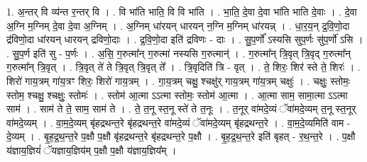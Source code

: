 \documentclass[17pt]{extarticle}
\begin{document}
1. अ॒न्तर् वि व्य॑न्त र॒न्तर् वि । . वि भा॑ति भाति॒ वि वि भा॑ति । . भा॒ति॒ दे॒वा दे॒वा भा॑ति भाति दे॒वाः । . दे॒वा अ॒ग्नि म॒ग्निम् दे॒वा दे॒वा अ॒ग्निम् । . अ॒ग्निम् धा॑रयन् धारयन् न॒ग्नि म॒ग्निम् धा॑रयन्न् । . धा॒र॒य॒न् द्र॒वि॒णो॒दा द्र॑विणो॒दा धा॑रयन् धारयन् द्रविणो॒दाः । . द्र॒वि॒णो॒दा इति॑ द्रविणः - दाः । . सु॒प॒र्णो᳚ ऽस्यसि सुप॒र्णः सु॑प॒र्णो॑ ऽसि । . सु॒प॒र्ण इति॑ सु - प॒र्णः । . अ॒सि॒ ग॒रुत्मा᳚न् ग॒रुत्मा॑ नस्यसि ग॒रुत्मान्॑ । . ग॒रुत्मा᳚न् त्रि॒वृत् त्रि॒वृद् ग॒रुत्मा᳚न् ग॒रुत्मा᳚न् त्रि॒वृत् । . त्रि॒वृत् ते॑ ते त्रि॒वृत् त्रि॒वृत् ते᳚ । . त्रि॒वृदिति॑ त्रि - वृत् । . ते॒ शिरः॒ शिर॑ स्ते ते॒ शिरः॑ । . शिरो॑ गाय॒त्रम् गा॑य॒त्रꣳ शिरः॒ शिरो॑ गाय॒त्रम् । . गा॒य॒त्रम् चक्षु॒ श्चक्षु॑र् गाय॒त्रम् गा॑य॒त्रम् चक्षुः॑ । . चक्षुः॒ स्तोमः॒ स्तोम॒ श्चक्षु॒ श्चक्षुः॒ स्तोमः॑ । . स्तोम॑ आ॒त्मा ऽऽत्मा स्तोमः॒ स्तोम॑ आ॒त्मा । . आ॒त्मा साम॒ सामा॒त्मा ऽऽत्मा साम॑ । . साम॑ ते ते॒ साम॒ साम॑ ते । . ते॒ त॒नू स्त॒नू स्ते॑ ते त॒नूः । . त॒नूर् वा॑मदे॒व्यं ॅवा॑मदे॒व्यम् त॒नू स्त॒नूर् वा॑मदे॒व्यम् । . वा॒म॒दे॒व्यम् बृ॑हद्रथन्त॒रे बृ॑हद्रथन्त॒रे वा॑मदे॒व्यं ॅवा॑मदे॒व्यम् बृ॑हद्रथन्त॒रे । . वा॒म॒दे॒व्यमिति॑ वाम - दे॒व्यम् । . बृ॒ह॒द्र॒थ॒न्त॒रे प॒क्षौ प॒क्षौ बृ॑हद्रथन्त॒रे बृ॑हद्रथन्त॒रे प॒क्षौ । . बृ॒ह॒द्र॒थ॒न्त॒रे इति॑ बृहत् - र॒थ॒न्त॒रे । . प॒क्षौ य॑ज्ञाय॒ज्ञियं॑ ॅयज्ञाय॒ज्ञिय॑म् प॒क्षौ प॒क्षौ य॑ज्ञाय॒ज्ञिय᳚म् । \newline
\end{document}
